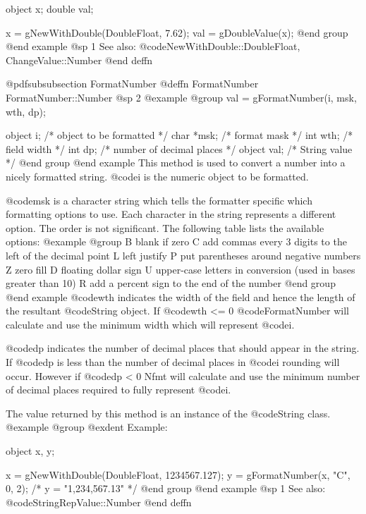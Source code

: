 object  x;
double  val;

x = gNewWithDouble(DoubleFloat, 7.62);
val = gDoubleValue(x);
@end group
@end example
@sp 1
See also:  @code{NewWithDouble::DoubleFloat, ChangeValue::Number}
@end deffn










@pdfsubsubsection {FormatNumber}
@deffn {FormatNumber} FormatNumber::Number
@sp 2
@example
@group
val = gFormatNumber(i, msk, wth, dp);

object  i;      /*  object to be formatted      */
char    *msk;   /*  format mask                 */
int     wth;    /*  field width                 */
int     dp;     /*  number of decimal places    */
object  val;    /*  String value                */
@end group
@end example
This method is used to convert a number into a nicely formatted string.
@code{i} is the numeric object to be formatted.

@code{msk} is a character string which tells the formatter specific
which formatting options to use.  Each character in the string
represents a different option.  The order is not significant.  The
following table lists the available options:
@example
@group
B   blank if zero
C   add commas every 3 digits to the left of the decimal point
L   left justify
P   put parentheses around negative numbers
Z   zero fill
D   floating dollar sign
U   upper-case letters in conversion (used in bases greater
    than 10)
R   add a percent sign to the end of the number
@end group
@end example
@code{wth} indicates the width of the field and hence the length of the
resultant @code{String} object.  If @code{wth} <= 0 @code{FormatNumber} will
calculate and use the minimum width which will represent @code{i}.

@code{dp} indicates the number of decimal places that should appear in
the string.  If @code{dp} is less than the number of decimal places in
@code{i} rounding will occur.  However if @code{dp} < 0 Nfmt will
calculate and use the minimum number of decimal places required to fully
represent @code{i}.

The value returned by this method is an instance of the @code{String} class.
@example
@group
@exdent Example:

object  x, y;

x = gNewWithDouble(DoubleFloat, 1234567.127);
y = gFormatNumber(x, "C", 0, 2);    /*  y = "1,234,567.13"  */
@end group
@end example
@sp 1
See also:  @code{StringRepValue::Number}
@end deffn











